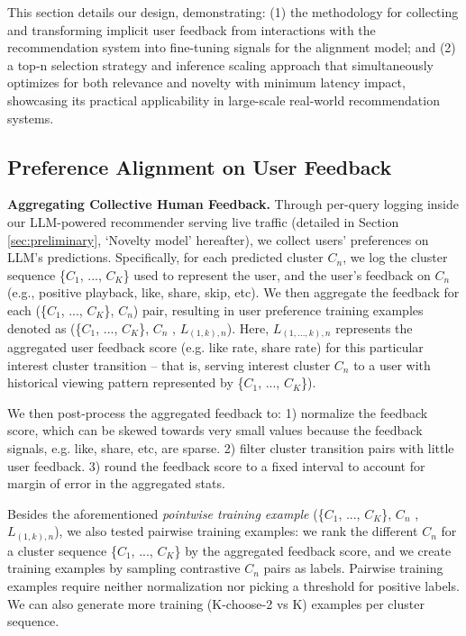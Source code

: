 \documentclass[11pt]{article}
\begin{document}
This section details our design, demonstrating: (1) the methodology for collecting and transforming implicit user feedback from interactions with the recommendation system into fine-tuning signals for the alignment model; and (2) a top-n selection strategy and inference scaling approach that simultaneously optimizes for both relevance and novelty with minimum latency impact, showcasing its practical applicability in large-scale real-world recommendation systems.

\subsection{Preference Alignment on User Feedback}

\smallskip
\noindent\textbf{Aggregating Collective Human Feedback.}
Through per-query logging inside our LLM-powered recommender serving live traffic (detailed in Section \ref{sec:preliminary}, `Novelty model' hereafter), we collect users' preferences on LLM's predictions. Specifically, for each predicted cluster $C_n$, we log the cluster sequence  \{$C_1$, ..., $C_{K}$\} used to represent the user, and the user's feedback on $C_n$ (e.g., positive playback, like, share, skip, etc). We then aggregate the feedback for each (\{$C_1$, ..., $C_{K}$\}, $C_n$) pair, resulting in user preference training examples denoted as (\{$C_1$, ..., $C_{K}$\}, $C_n$ , $L_{(1,k),n}$). Here, $L_{(1,...,k),n}$ represents the aggregated user feedback score (e.g. like rate, share rate) for this particular interest cluster transition – that is, serving interest cluster $C_n$ to a user with historical viewing pattern represented by \{$C_1$, ..., $C_{K}$\}). 

We then post-process the aggregated feedback to: 1) normalize the feedback score, which can be skewed towards very small values because the feedback signals, e.g. like, share, etc, are sparse. 
2) filter cluster transition pairs with little user feedback. 3) round the feedback score to a fixed interval to account for margin of error in the aggregated stats.

Besides the aforementioned \textit{pointwise training example} (\{$C_1$, ..., $C_{K}$\}, $C_n$ , $L_{(1,k),n}$), we also tested pairwise training examples: we rank the different $C_n$ for a cluster sequence  \{$C_1$, ..., $C_{K}$\} by the aggregated feedback score, and we create training examples by sampling contrastive $C_n$ pairs as labels. Pairwise training examples require neither normalization nor picking a threshold for positive labels. We can also generate more training (K-choose-2 vs K) examples per cluster sequence. 
\end{document}
